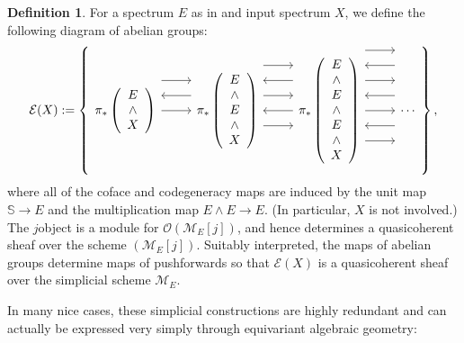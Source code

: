 \documentclass{amsart}
\renewcommand{\S}{\mathbb S}
\newcommand{\<}{\langle}
\renewcommand{\>}{\rangle}
\newcommand{\sm}{\wedge}
\newcommand{\sheaf}[1]{\mathcal{#1}}
\theoremstyle{plain}
\theoremstyle{definition}
\newtheorem*{definition}{Definition}
\theoremstyle{remark}
\begin{document}
\begin{definition}\label{DefnHomologyFunctorsValuedInSheaves}
For a spectrum $E$ as in  and input spectrum $X$, we define the following diagram of abelian groups:
\[\sheaf{E}(X) := \left\{
\begin{tikzcd}
\pi_* \left( \begin{array}{c} E \\ \sm \\ X \end{array} \right) \arrow[leftarrow, shift left=\baselineskip]{r} \arrow[shift left=(2*\baselineskip)]{r} \arrow{r} &
\pi_* \left( \begin{array}{c} E \\ \sm \\ E \\ \sm \\ X \end{array} \right) \arrow[shift left=(3*\baselineskip)]{r} \arrow[leftarrow, shift left=(2*\baselineskip)]{r} \arrow[shift left=\baselineskip]{r} \arrow[leftarrow]{r} \arrow[shift right=\baselineskip]{r} &
\pi_* \left( \begin{array}{c} E \\ \sm \\ E \\ \sm \\ E \\ \sm \\ X \end{array} \right) \arrow[shift left=(4*\baselineskip)]{r} \arrow[leftarrow, shift left=(3*\baselineskip)]{r} \arrow[shift left=(2*\baselineskip)]{r} \arrow[leftarrow, shift left=\baselineskip]{r} \arrow{r} \arrow[leftarrow, shift right=\baselineskip]{r} \arrow[shift right=(2*\baselineskip)]{r} &
\cdots
\end{tikzcd}
\right\},\]
where all of the coface and codegeneracy maps are induced by the unit map $\S \to E$ and the multiplication map $E \sm E \to E$.  (In particular, $X$ is not involved.)  The $j$\th object is a module for $\sheaf{O}(\sheaf M_E[j])$, and hence determines a quasicoherent sheaf over the scheme $(\sheaf M_E[j])$.  Suitably interpreted, the maps of abelian groups determine maps of pushforwards so that $\sheaf{E}(X)$ is a quasicoherent sheaf over the simplicial scheme $\sheaf M_E$.
\end{definition}

In many nice cases, these simplicial constructions are highly redundant and can actually be expressed very simply through equivariant algebraic geometry:
\end{document}
